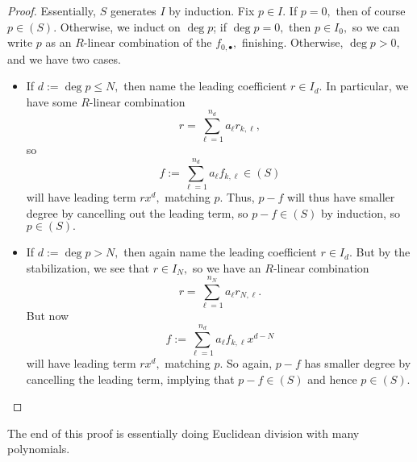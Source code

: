 \documentclass[../notes.tex]{subfiles}
\begin{document}
\begin{proof}
	Essentially, $S$ generates $I$ by induction. Fix $p\in I.$ If $p=0,$ then of course $p\in(S).$ Otherwise, we induct on $\deg p$; if $\deg p=0,$ then $p\in I_0,$ so we can write $p$ as an $R$-linear combination of the $f_{0,\bullet},$ finishing. Otherwise, $\deg p>0,$ and we have two cases.
	\begin{itemize}
		\item If $d:=\deg p\le N,$ then name the leading coefficient $r\in I_d.$ In particular, we have some $R$-linear combination
		\[r=\sum_{\ell=1}^{n_d}a_\ell r_{k,\ell},\]
		so
		\[f:=\sum_{\ell=1}^{n_d}a_\ell f_{k,\ell}\in(S)\]
		will have leading term $rx^d,$ matching $p.$ Thus, $p-f$ will thus have smaller degree by cancelling out the leading term, so $p-f\in(S)$ by induction, so $p\in(S).$
		\item If $d:=\deg p>N,$ then again name the leading coefficient $r\in I_d.$ But by the stabilization, we see that $r\in I_N,$ so we have an $R$-linear combination
		\[r=\sum_{\ell=1}^{n_N}a_\ell r_{N,\ell}.\]
		But now
		\[f:=\sum_{\ell=1}^{n_d}a_\ell f_{k,\ell}x^{d-N}\]
		will have leading term $rx^d,$ matching $p.$ So again, $p-f$ has smaller degree by cancelling the leading term, implying that $p-f\in (S)$ and hence $p\in(S).$
		\qedhere
	\end{itemize}
\end{proof}
\begin{remark}[Nir]
	The end of this proof is essentially doing Euclidean division with many polynomials.
\end{remark}
\end{document}
